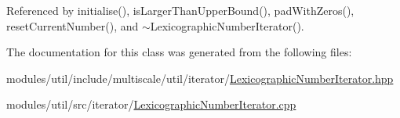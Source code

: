 Referenced by initialise(), is\-Larger\-Than\-Upper\-Bound(), pad\-With\-Zeros(), reset\-Current\-Number(), and $\sim$\-Lexicographic\-Number\-Iterator().



The documentation for this class was generated from the following files\-:\begin{DoxyCompactItemize}
\item 
modules/util/include/multiscale/util/iterator/\hyperlink{LexicographicNumberIterator_8hpp}{Lexicographic\-Number\-Iterator.\-hpp}\item 
modules/util/src/iterator/\hyperlink{LexicographicNumberIterator_8cpp}{Lexicographic\-Number\-Iterator.\-cpp}\end{DoxyCompactItemize}
